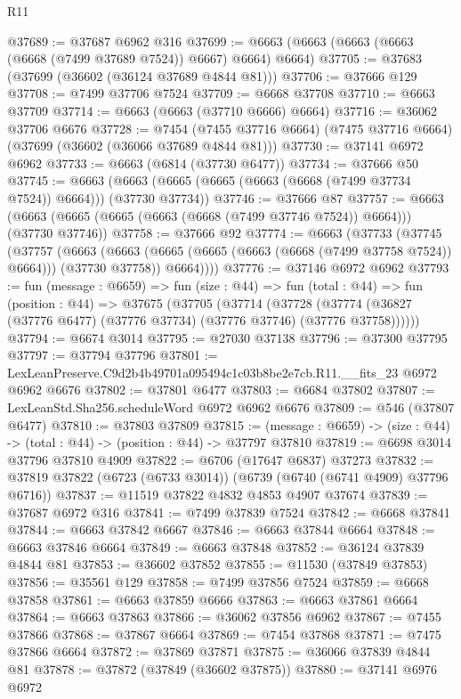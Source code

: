 \begin{lexlean}{R11}
\begin{coremodule}
@37689 := @37687 @6962 @316
@37699 := @6663 (@6663 (@6663 (@6663 (@6668 (@7499 @37689 @7524)) @6667) @6664) @6664)
@37705 := @37683 (@37699 (@36602 (@36124 @37689 @4844 @81)))
@37706 := @37666 @129
@37708 := @7499 @37706 @7524
@37709 := @6668 @37708
@37710 := @6663 @37709
@37714 := @6663 (@6663 (@37710 @6666) @6664)
@37716 := @36062 @37706 @6676
@37728 := @7454
    (@7455 @37716 @6664)
    (@7475 @37716 @6664)
    (@37699 (@36602 (@36066 @37689 @4844 @81)))
@37730 := @37141 @6972 @6962
@37733 := @6663 (@6814 (@37730 @6477))
@37734 := @37666 @50
@37745 := @6663 (@6663 (@6665 (@6665 (@6663 (@6668 (@7499 @37734 @7524)) @6664))) (@37730 @37734))
@37746 := @37666 @87
@37757 := @6663 (@6663 (@6665 (@6665 (@6663 (@6668 (@7499 @37746 @7524)) @6664))) (@37730 @37746))
@37758 := @37666 @92
@37774 := @6663
    (@37733
      (@37745
        (@37757
          (@6663
            (@6663 (@6665 (@6665 (@6663 (@6668 (@7499 @37758 @7524)) @6664))) (@37730 @37758))
            @6664))))
@37776 := @37146 @6972 @6962
@37793 := fun (message : @6659) =>
  fun (size : @44) =>
  fun (total : @44) =>
  fun (position : @44) =>
  @37675
    (@37705
      (@37714
        (@37728 (@37774 (@36827 (@37776 @6477) (@37776 @37734) (@37776 @37746) (@37776 @37758))))))
@37794 := @6674 @3014
@37795 := @27030 @37138
@37796 := @37300 @37795
@37797 := @37794 @37796
@37801 := LexLeanPreserve.C9d2b4b49701a095494c1c03b8be2e7cb.R11.__fits_23 @6972 @6962 @6676
@37802 := @37801 @6477
@37803 := @6684 @37802
@37807 := LexLeanStd.Sha256.scheduleWord @6972 @6962 @6676
@37809 := @546 (@37807 @6477)
@37810 := @37803 @37809
@37815 := (message : @6659) -> (size : @44) -> (total : @44) -> (position : @44) -> @37797 @37810
@37819 := @6698 @3014 @37796 @37810 @4909
@37822 := @6706 (@17647 @6837) @37273
@37832 := @37819 @37822 (@6723 (@6733 @3014)) (@6739 (@6740 (@6741 @4909) @37796 @6716))
@37837 := @11519 @37822 @4832 @4853 @4907 @37674
@37839 := @37687 @6972 @316
@37841 := @7499 @37839 @7524
@37842 := @6668 @37841
@37844 := @6663 @37842 @6667
@37846 := @6663 @37844 @6664
@37848 := @6663 @37846 @6664
@37849 := @6663 @37848
@37852 := @36124 @37839 @4844 @81
@37853 := @36602 @37852
@37855 := @11530 (@37849 @37853)
@37856 := @35561 @129
@37858 := @7499 @37856 @7524
@37859 := @6668 @37858
@37861 := @6663 @37859 @6666
@37863 := @6663 @37861 @6664
@37864 := @6663 @37863
@37866 := @36062 @37856 @6962
@37867 := @7455 @37866
@37868 := @37867 @6664
@37869 := @7454 @37868
@37871 := @7475 @37866 @6664
@37872 := @37869 @37871
@37875 := @36066 @37839 @4844 @81
@37878 := @37872 (@37849 (@36602 @37875))
@37880 := @37141 @6976 @6972

\end{coremodule}
\end{lexlean}
